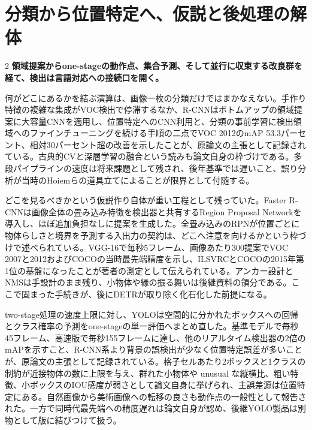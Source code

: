 \documentclass[lualatex,a4paper,10pt]{jlreq}
\begin{document}
\section{分類から位置特定へ、仮説と後処理の解体}
\label{sec:p02}
\begin{multicols}{2}
\raggedcolumns
\noindent\textbf{領域提案からone-stageの動作点、集合予測、そして並行に収束する改良群を経て、検出は言語対応への接続口を開く。}\autocite{vmd005,vmd006,vmd010,vmd011,vmd012,vmd123,vmd124,vmd125}\par\medskip
\noindent 何がどこにあるかを結ぶ演算は、画像一枚の分類だけではまかなえない。手作り特徴の複雑な集成がVOC検出で停滞するなか、R-CNNはボトムアップの領域提案に大容量CNNを適用し、位置特定へのCNN利用と、分類の事前学習に検出領域へのファインチューニングを続ける手順の二点でVOC 2012のmAP 53.3パーセント、相対30パーセント超の改善を示したことが、原論文の主張として記録されている。古典的CVと深層学習の融合という読みも論文自身の枠づけである。多段パイプラインの速度は将来課題として残され、後年基準では遅いこと、誤り分析が当時のHoiemらの道具立てによることが限界として付随する。\autocite{vmd005}\par\medskip
\noindent どこを見るべきかという仮説作り自体が重い工程として残っていた。Faster R-CNNは画像全体の畳み込み特徴を検出器と共有するRegion Proposal Networkを導入し、ほぼ追加負担なしに提案を生成した。全畳み込みのRPNが位置ごとに物体らしさと境界を予測する入出力の契約は、どこへ注意を向けるかという枠づけで述べられている。VGG-16で毎秒5フレーム、画像あたり300提案でVOC 2007と2012およびCOCOの当時最先端精度を示し、ILSVRCとCOCOの2015年第1位の基盤になったことが著者の測定として伝えられている。アンカー設計とNMSは手設計のまま残り、小物体や縁の振る舞いは後継資料の領分である。ここで固まった手続きが、後にDETRが取り除く化石化した前提になる。\autocite{vmd006}\par\medskip
\noindent two-stage処理の速度上限に対し、YOLOは空間的に分かれたボックスへの回帰とクラス確率の予測をone-stageの単一評価へまとめ直した。基準モデルで毎秒45フレーム、高速版で毎秒155フレームに達し、他のリアルタイム検出器の2倍のmAPを示すこと、R-CNN系より背景の誤検出が少なく位置特定誤差が多いことが、原論文の主張として記録されている。格子セルあたり2ボックスと1クラスの制約が近接物体の数に上限を与え、群れた小物体や unusual な縦横比、粗い特徴、小ボックスのIOU感度が弱さとして論文自身に挙げられ、主誤差源は位置特定にある。自然画像から美術画像への転移の良さも動作点の一般性として報告された。一方で同時代最先端への精度遅れは論文自身が認め、後継YOLO製品は別物として版に結びつけて扱う。\autocite{vmd007}\par\medskip

\end{multicols}
\end{document}
